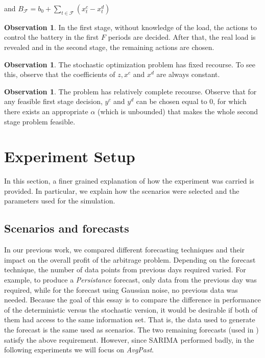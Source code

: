 \documentclass[11pt]{article}
\theoremstyle{definition}
\newtheorem{observation}[thm]{\textbf{Observation}}
\begin{document}
and $B_{\mathcal{F}} = b_0 + \sum_{t \in \mathcal{F}} (x^c_t - x^d_t)$

\begin{observation}
	In the first stage, without knowledge of the load, the actions to control the battery in the first $F$ periods are decided. After that, the real load is revealed and in the second stage, the remaining actions are chosen. 
\end{observation}

\begin{observation}
The stochastic optimization problem has fixed recourse. To see this, observe that the coefficients of $z, x^c$ and $x^d$ are always constant.
\end{observation}

\begin{observation}
	The problem has relatively complete recourse. Observe that for any feasible first stage decision, $y^c$ and $y^d$ can be chosen equal to 0, for which there exists an appropriate $\alpha$ (which is unbounded) that makes the whole second stage problem feasible.
\end{observation}

\section{Experiment Setup}

In this section, a finer grained explanation of how the experiment was carried is provided. In particular, we explain how the scenarios were selected and the parameters used for the simulation.
\subsection{Scenarios and forecasts}

In our previous work, we compared different forecasting techniques and their impact on the overall profit of the arbitrage problem. Depending on the forecast technique, the number of data points from previous days required varied. For example, to produce a \textit{Persistance} forecast, only data from the previous day was required, while for the forecast using Gaussian noise, no previous data was needed.
Because the goal of this essay is to compare the difference in performance of the deterministic versus the stochastic version, it would be desirable if both of them had access to the same information set. That is, the data used to generate the forecast is the same used as scenarios. 
The two remaining forecasts (used in \cite{kiedanski}) satisfy the above requirement. However, since SARIMA performed badly, in the following experiments we will focus on \textit{AvgPast}.
\end{document}
